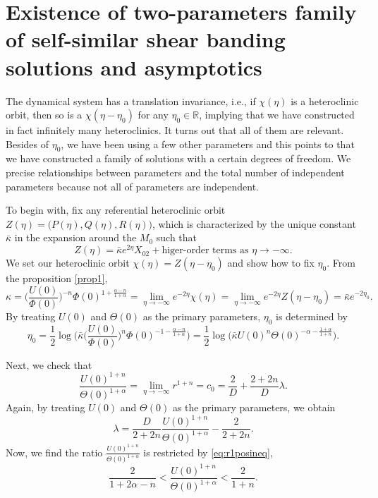 \documentclass[a4paper,11pt]{article}
\begin{document}
\section{Existence of two-parameters family of self-similar shear banding solutions and asymptotics}
The dynamical system has a translation invariance, i.e., if $\chi(\eta)$ is a heteroclinic orbit, then so is a $\chi(\eta-\eta_0)$ for any $\eta_0\in \mathbb{R}$, implying that we have constructed in fact infinitely many heteroclinics. It turns out that all of them are relevant.  Besides of $\eta_0$, we have been using a few other parameters and this points to that we have constructed a family of solutions with a certain degrees of freedom. We precise relationships between parameters and the total number of independent parameters because not all of parameters are independent.

To begin with, fix any referential heteroclinic orbit $Z(\eta)=\big(P(\eta),Q(\eta),R(\eta)\big)$, which is characterized by the unique constant $\bar{\kappa}$ in the expansion around the $M_0$ such that
$$ Z(\eta) = \bar{\kappa}e^{2\eta}X_{02} + \text{higer-order terms as $\eta \rightarrow -\infty$.}$$%
We set our heteroclinic orbit $\chi(\eta) = Z(\eta-\eta_0)$ and show how to fix $\eta_0$. From the proposition \ref{prop1}, 
$$ \kappa = \Big(\frac{U(0)}{\Phi(0)}\Big)^{-n}\Phi(0)^{1+\frac{\alpha-n}{1+\alpha}}=\lim_{\eta \rightarrow -\infty} e^{-2\eta}\chi(\eta)  = \lim_{\eta \rightarrow -\infty} e^{-2\eta} Z(\eta-\eta_0) =\bar{\kappa}e^{-2\eta_0}.$$
By treating $U(0)$ and $\Theta(0)$ as the primary parameters, $\eta_0$ is determined by
\begin{equation}
 \eta_0 = \frac{1}{2} \log\Big(\bar{\kappa} \Big(\frac{U(0)}{\Phi(0)}\Big)^{n}\Phi(0)^{-1-\frac{\alpha-n}{1+\alpha}}  \Big) = \frac{1}{2} \log\Big(\bar{\kappa} U(0)^n \Theta(0)^{-\alpha-\frac{1+\alpha}{1+n}}  \Big). \label{eq:eta0}
\end{equation}

Next, we check that 
$$ \frac{U(0)^{1+n}}{\Theta(0)^{1+\alpha}} = \lim_{\eta \rightarrow -\infty} r^{1+n} = c_0 = \frac{2}{D} + \frac{2+2n}{D}\lambda.$$
Again, by treating $U(0)$ and $\Theta(0)$ as the primary parameters, we obtain
\begin{equation}
 \lambda = \frac{D}{2+2n}\frac{U(0)^{1+n}}{\Theta(0)^{1+\alpha}} - \frac{2}{2+2n}. \label{eq:lambda}
\end{equation}
Now, we find the ratio $\frac{U(0)^{1+n}}{\Theta(0)^{1+\alpha}}$ is restricted by \eqref{eq:r1posineq},
\begin{equation} \label{eq:restriction}
 \frac{2}{1+2\alpha-n} < \frac{U(0)^{1+n}}{\Theta(0)^{1+\alpha}} < \frac{2}{1+n}.
\end{equation}
\end{document}
